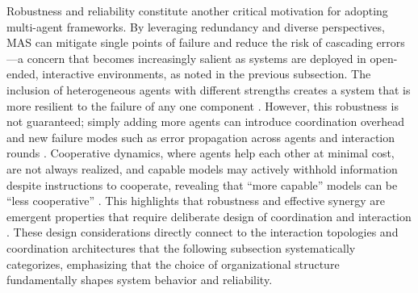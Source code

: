 \documentclass[11pt]{article}
\begin{document}
Robustness and reliability constitute another critical motivation for adopting multi-agent frameworks. By leveraging redundancy and diverse perspectives, MAS can mitigate single points of failure and reduce the risk of cascading errors---a concern that becomes increasingly salient as systems are deployed in open-ended, interactive environments, as noted in the previous subsection. The inclusion of heterogeneous agents with different strengths creates a system that is more resilient to the failure of any one component \cite{ref30,ref32}. However, this robustness is not guaranteed; simply adding more agents can introduce coordination overhead and new failure modes such as error propagation across agents and interaction rounds \cite{ref2,ref28}. Cooperative dynamics, where agents help each other at minimal cost, are not always realized, and capable models may actively withhold information despite instructions to cooperate, revealing that ``more capable'' models can be ``less cooperative'' \cite{ref33}. This highlights that robustness and effective synergy are emergent properties that require deliberate design of coordination and interaction \cite{ref28}. These design considerations directly connect to the interaction topologies and coordination architectures that the following subsection systematically categorizes, emphasizing that the choice of organizational structure fundamentally shapes system behavior and reliability.
\end{document}

